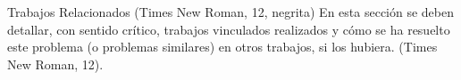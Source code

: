 Trabajos Relacionados (Times New Roman, 12, negrita) 
En esta sección se deben detallar, con sentido crítico, trabajos vinculados realizados y cómo se ha resuelto este problema (o problemas similares) en otros trabajos, si los hubiera. (Times New Roman, 12).
